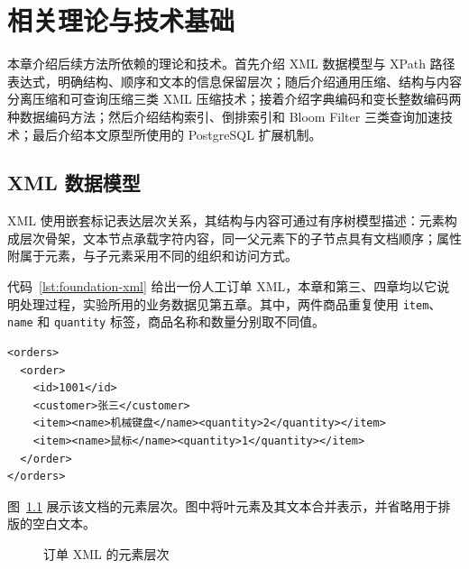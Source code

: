 \chapter{相关理论与技术基础}

本章介绍后续方法所依赖的理论和技术。首先介绍 XML 数据模型与 XPath 路径表达式，明确结构、顺序和文本的信息保留层次；随后介绍通用压缩、结构与内容分离压缩和可查询压缩三类 XML 压缩技术；接着介绍字典编码和变长整数编码两种数据编码方法；然后介绍结构索引、倒排索引和 Bloom Filter 三类查询加速技术；最后介绍本文原型所使用的 PostgreSQL 扩展机制。

\section{XML 数据模型}

XML 使用嵌套标记表达层次关系，其结构与内容可通过有序树模型描述：元素构成层次骨架，文本节点承载字符内容，同一父元素下的子节点具有文档顺序；属性附属于元素，与子元素采用不同的组织和访问方式\cite{w3c2008xml}。

代码~\ref{lst:foundation-xml} 给出一份人工订单 XML，本章和第三、四章均以它说明处理过程，实验所用的业务数据见第五章。其中，两件商品重复使用 \texttt{item}、\texttt{name} 和 \texttt{quantity} 标签，商品名称和数量分别取不同值。

\begin{lstlisting}[caption={订单 XML 示例},label={lst:foundation-xml},numbers=none]
<orders>
  <order>
    <id>1001</id>
    <customer>张三</customer>
    <item><name>机械键盘</name><quantity>2</quantity></item>
    <item><name>鼠标</name><quantity>1</quantity></item>
  </order>
</orders>
\end{lstlisting}

图~\ref{fig:foundation-xml-tree} 展示该文档的元素层次。图中将叶元素及其文本合并表示，并省略用于排版的空白文本。

\begin{figure}[htbp]
\centering
{}
\caption{订单 XML 的元素层次}
\label{fig:foundation-xml-tree}
\end{figure}

